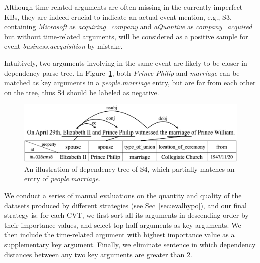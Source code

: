 Although time-related arguments are often missing in the currently imperfect KBs, 
they are indeed crucial to indicate an actual event mention, e.g., S3, containing \emph{Microsoft} as \emph{acquiring\_company} and \emph{aQuantive} as \emph{company\_acquired} but without time-related arguments, will be considered as a positive sample for event \emph{business.accquisition} by mistake.

Intuitively, two arguments involving in the same event are likely to be closer in dependency parse tree.
In Figure~\ref{fig:2}, both \emph{Prince Philip} and \emph{marriage} can be matched as key arguments in a \textit{people.marriage} entry, but are far from each other on the tree, thus S4 should be labeled as negative.

\begin{figure}
\centering
	\includegraphics[width=.47\textwidth]{deppath}
	\caption{An illustration of dependency tree of S4, which partially matches an entry of \emph{people.marriage}. \label{fig:2}}
\end{figure}

We conduct a series of manual evaluations on the quantity and quality of the datasets produced by different strategies (see Sec~\ref{sec:evalhypo}), and 
our final strategy is: 
for each CVT, we first sort all its arguments in descending order by their importance values, and select top half arguments as key arguments. 
We then include the time-related argument with highest importance value as a supplementary key argument. 
Finally, we eliminate sentence in which dependency distances between any two key arguments are greater than 2.

